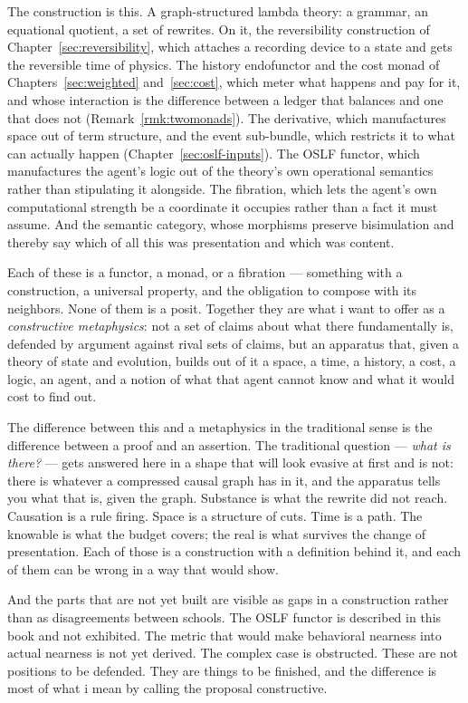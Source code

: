 The construction is this.
A graph-structured lambda theory: a grammar, an equational
quotient, a set of rewrites.
On it, the reversibility construction of
Chapter~\ref{sec:reversibility}, which attaches a recording device
to a state and gets the reversible time of physics.
The history endofunctor and the cost monad of
Chapters~\ref{sec:weighted} and~\ref{sec:cost}, which meter what
happens and pay for it, and whose interaction is the difference
between a ledger that balances and one that
does not (Remark~\ref{rmk:twomonads}).
The derivative, which manufactures space out of term structure,
and the event sub-bundle, which restricts it to what can actually
happen (Chapter~\ref{sec:oslf-inputs}).
The OSLF functor, which manufactures the agent's logic out of the
theory's own operational semantics rather than stipulating it
alongside.
The fibration, which lets the agent's own computational strength be
a coordinate it occupies rather than a fact it must assume.
And the semantic category, whose morphisms preserve bisimulation
and thereby say which of all this was presentation and which was
content.

Each of these is a functor, a monad, or a fibration --- something
with a construction, a universal property, and the obligation to
compose with its neighbors.
None of them is a posit.
Together they are what i want to offer as a \emph{constructive
metaphysics}: not a set of claims about what there fundamentally
is, defended by argument against rival sets of claims, but an
apparatus that, given a theory of state and evolution, builds out
of it a space, a time, a history, a cost, a logic, an agent, and a
notion of what that agent cannot know and what it would cost to
find out.

The difference between this and a metaphysics in the traditional
sense is the difference between a proof and an assertion.
The traditional question --- \emph{what is there?} --- gets
answered here in a shape that will look evasive at first and is
not: there is whatever a compressed causal graph has in it, and the
apparatus tells you what that is, given the graph.
Substance is what the rewrite did not reach.
Causation is a rule firing.
Space is a structure of cuts.
Time is a path.
The knowable is what the budget covers; the real is what survives
the change of presentation.
Each of those is a construction with a definition behind it, and
each of them can be wrong in a way that would show.

And the parts that are not yet built are visible as gaps in a
construction rather than as disagreements between schools.
The OSLF functor is described in this book and not exhibited.
The metric that would make behavioral nearness into actual nearness
is not yet derived.
The complex case is obstructed.
These are not positions to be defended.
They are things to be finished, and the difference is most of what
i mean by calling the proposal constructive.

